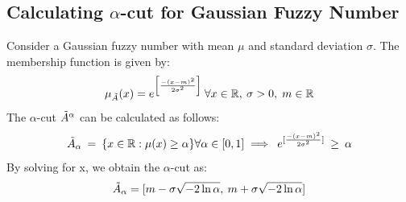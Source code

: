 \documentclass{article}
\begin{document}
\subsection{Calculating $\alpha$-cut for Gaussian Fuzzy Number}
Consider a Gaussian fuzzy number with mean $\mu$ and standard deviation $\sigma$. The membership function is given by:
\begin{equation}
\mu_ {\Tilde{A}} (x) = e^{\left[ \frac{-(x-m)^2}{2\sigma^{2}} \right]} \: \forall {x} \in \mathbb{R}, \: \sigma > 0, \; m\in \mathbb{R}
\end{equation}
The $\alpha$-cut $\Tilde{A}^{\alpha}$ can be calculated as follows:
\begin{equation}
    \Tilde{A}_{\alpha} \:=\: \{ x \in \mathbb{R} : \mu(x) \geq \alpha \} \forall \alpha \in [0, 1]
     \implies \: e^{[ \frac{-(x-m)^2}{2\sigma^{2}} ]}  \: \geq \:  \alpha
\end{equation}\newline By solving for x, we obtain the $\alpha$-cut as:
\begin{equation}\label{alpha_fuzzy}
    \Tilde{A}_{\alpha} = [m-\sigma\sqrt{-2\ln{\alpha}}, \: m+\sigma\sqrt{-2\ln{\alpha}} ]
\end{equation}
\end{document}
